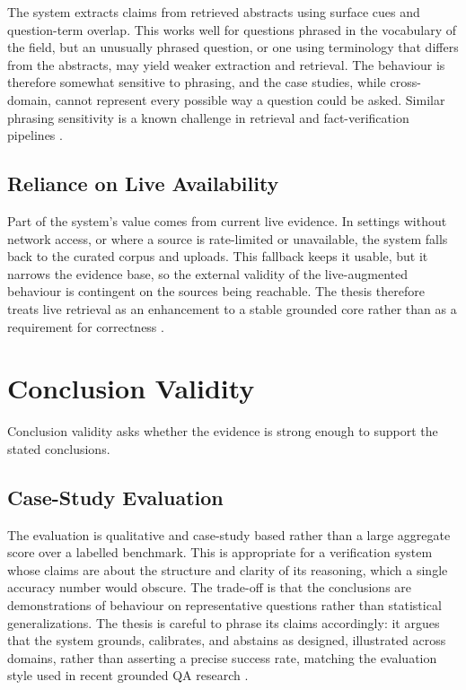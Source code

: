 The system extracts claims from retrieved abstracts using surface cues and question-term overlap. This works well
for questions phrased in the vocabulary of the field, but an unusually phrased question, or one using terminology
that differs from the abstracts, may yield weaker extraction and retrieval. The behaviour is therefore somewhat
sensitive to phrasing, and the case studies, while cross-domain, cannot represent every possible way a question
could be asked. Similar phrasing sensitivity is a known challenge in retrieval and fact-verification pipelines
\cite{min2023factscore,lin2021truthfulqa,honovich2022true,es2023ragas}.

\subsection{Reliance on Live Availability }

Part of the system's value comes from current live evidence. In settings without network access, or where a source
is rate-limited or unavailable, the system falls back to the curated corpus and uploads. This fallback keeps it
usable, but it narrows the evidence base, so the external validity of the live-augmented behaviour is contingent on
the sources being reachable. The thesis therefore treats live retrieval as an enhancement to a stable grounded core
rather than as a requirement for correctness \cite{lewis2020rag,guu2020realm,asai2024selfrag}.

\section{Conclusion Validity }

Conclusion validity asks whether the evidence is strong enough to support the stated conclusions.

\subsection{Case-Study Evaluation }

The evaluation is qualitative and case-study based rather than a large aggregate score over a labelled benchmark.
This is appropriate for a verification system whose claims are about the structure and clarity of its reasoning,
which a single accuracy number would obscure. The trade-off is that the conclusions are demonstrations of behaviour
on representative questions rather than statistical generalizations. The thesis is careful to phrase its claims
accordingly: it argues that the system grounds, calibrates, and abstains as designed, illustrated across domains,
rather than asserting a precise success rate, matching the evaluation style used in recent grounded QA research
\cite{es2023ragas,min2023factscore,lin2021truthfulqa}.

